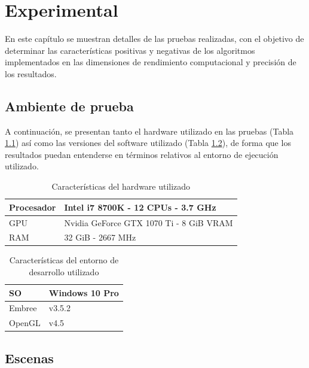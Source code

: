 \chapter{Experimental}
\label{ch:chap05}

En este capítulo se muestran detalles de las pruebas realizadas, con el objetivo de determinar las características positivas y negativas de los algoritmos implementados en las dimensiones de rendimiento computacional y precisión de los resultados.

\section{Ambiente de prueba}
\label{sec:hardware}

A continuación, se presentan tanto el hardware utilizado en las pruebas (Tabla \ref{table:hardware}) así como las versiones del software utilizado (Tabla \ref{table:software}), de forma que los resultados puedan entenderse en términos relativos al entorno de ejecución utilizado.

\begin{table}[htbp!]
	\centering
	\begin{tabular}{l|l}
		Procesador & Intel i7 8700K - 12 CPUs - 3.7 GHz       \\
		\hline
		GPU        & Nvidia GeForce GTX 1070 Ti - 8 GiB  VRAM \\
		\hline
		RAM        & 32 GiB - 2667 MHz                        \\
		\hline
	\end{tabular}
	\caption{Características del hardware utilizado}
	\label{table:hardware}
\end{table}

\begin{table}[htbp!]
	\centering
	\begin{tabular}{l|l}
	SO & Windows 10 Pro        \\
		\hline
	Embree        & v3.5.2 \\
		\hline
		OpenGL        & v4.5  \\
		\hline
	\end{tabular}
	\caption{Características del entorno de desarrollo utilizado}
		\label{table:software}
\end{table}

\section{Escenas}
\label{sec:escenas}

